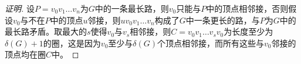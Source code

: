 \begin{proof}[证明]
      设$P=v_0v_1\ldots v_n$为$G$中的一条最长路，则$v_0$只能与$P$中的顶点相邻接，否则假设$v_0$与不在$P$中的顶点$u$邻接，则$uv_0v_1\ldots v_n$构成了$G$中一条更长的路，与$P$为$G$中的最长路矛盾。取最大的$s$使得$v_0$与$v_s$相邻接，则$C=v_0v_1\ldots v_sv_0$为长度至少为$\delta(G)+1$的圈，这是因为$v_0$至少与$\delta(G)$个顶点相邻接，而所有这些与$v_0$邻接的顶点均在圈$C$中。
\end{proof}
